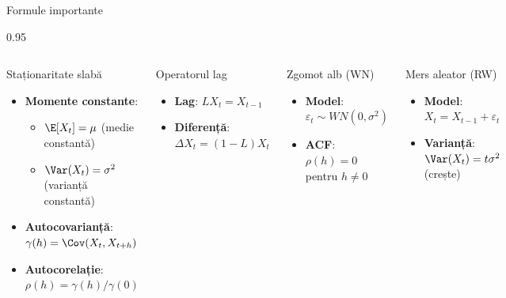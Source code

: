\documentclass[9pt, aspectratio=169, t]{beamer}
\begin{document}
\begin{frame}{Formule importante}
    \begin{cminipage}{0.95\textwidth}
        \begin{columns}[T]
            {\small
            \begin{block}{Staționaritate slabă}
                \begin{itemize}\setlength{\itemsep}{0pt}
                    \item \textbf{Momente constante}:
                    \begin{itemize}
                        \item $\E[X_t] = \mu$ (medie constantă)
                        \item $\Var(X_t) = \sigma^2$ (varianță constantă)
                    \end{itemize}
                    \item \textbf{Autocovarianță}: $\gamma(h) = \Cov(X_t, X_{t+h})$
                    \item \textbf{Autocorelație}: $\rho(h) = \gamma(h)/\gamma(0)$
                \end{itemize}
            \end{block}

            \begin{block}{Operatorul lag}
                \begin{itemize}\setlength{\itemsep}{0pt}
                    \item \textbf{Lag}: $LX_t = X_{t-1}$
                    \item \textbf{Diferență}: $\Delta X_t = (1-L)X_t$
                \end{itemize}
            \end{block}
            }

            {\small
            \begin{exampleblock}{Zgomot alb (WN)}
                \begin{itemize}\setlength{\itemsep}{0pt}
                    \item \textbf{Model}: $\varepsilon_t \sim WN(0, \sigma^2)$
                    \item \textbf{ACF}: $\rho(h) = 0$ pentru $h \neq 0$
                \end{itemize}
            \end{exampleblock}

            \begin{alertblock}{Mers aleator (RW)}
                \begin{itemize}\setlength{\itemsep}{0pt}
                    \item \textbf{Model}: $X_t = X_{t-1} + \varepsilon_t$
                    \item \textbf{Varianță}: $\Var(X_t) = t\sigma^2$ (crește)
                \end{itemize}
            \end{alertblock}
            }
        \end{columns}
    \end{cminipage}
\end{frame}
\end{document}
